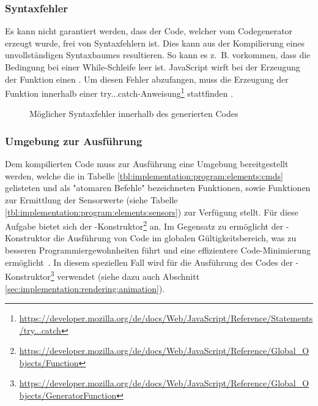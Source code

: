 \subsubsection{Syntaxfehler}

Es kann nicht garantiert werden, dass der Code, welcher vom Codegenerator erzeugt wurde, frei von Syntaxfehlern ist. Dies kann aus der Kompilierung eines unvollständigen Syntaxbaumes resultieren. So kann es z.~B. vorkommen, dass die Bedingung bei einer While-Schleife leer ist. JavaScript wirft bei der Erzeugung der Funktion einen . Um diesen Fehler abzufangen, muss die Erzeugung der Funktion innerhalb einer try...catch-Anweisung\footnote{\url{https://developer.mozilla.org/de/docs/Web/JavaScript/Reference/Statements/try...catch}} stattfinden .

\begin{figure}
  
  \caption{Möglicher Syntaxfehler innerhalb des generierten Codes}
  \label{fig:implementation:program:evaluation:try-catch}
\end{figure}

\subsubsection{Umgebung zur Ausführung\protect\footnotemark}


Dem kompilierten Code muss zur Ausführung eine Umgebung bereitgestellt werden, welche die in Tabelle \ref{tbl:implementation:program:elements:cmds} gelisteten und als "atomaren Befehle" bezeichneten Funktionen, sowie Funktionen zur Ermittlung der Sensorwerte (siehe Tabelle \ref{tbl:implementation:program:elements:sensors}) zur Verfügung stellt. Für diese Aufgabe bietet sich der -Konstruktor\footnote{\url{https://developer.mozilla.org/de/docs/Web/JavaScript/Reference/Global_Objects/Function}} an. Im Gegensatz zu  ermöglicht der -Konstruktor die Ausführung von Code im globalen Gültigkeitsbereich, was zu besseren Programmiergewohnheiten führt und eine effizientere Code-Minimierung ermöglicht~\cite{mdn-function}. In diesem speziellen Fall wird für die Ausführung des Codes der -Konstruktor\footnote{\url{https://developer.mozilla.org/de/docs/Web/JavaScript/Reference/Global_Objects/GeneratorFunction}} verwendet (siehe dazu auch Abschnitt \ref{sec:implementation:rendering:animation}).

